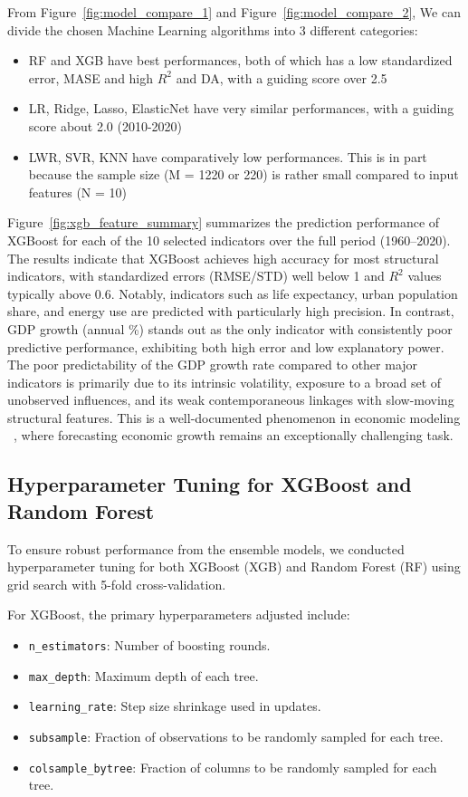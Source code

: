 \documentclass[12pt]{article}
\begin{document}
From Figure~\ref{fig:model_compare_1} and Figure~\ref{fig:model_compare_2}, We can divide the chosen Machine Learning algorithms into 3 different categories: 
\begin{itemize}
\item RF and XGB have best performances, both of which has a low standardized error, MASE and high $R^2$ and DA, with a guiding score over 2.5
\item LR, Ridge, Lasso, ElasticNet have very similar performances, with a guiding score about 2.0 (2010-2020)
\item LWR, SVR, KNN have comparatively low performances. This is in part because the sample size (M = 1220 or 220) is rather small compared to input features (N = 10)
\end{itemize}
Figure~\ref{fig:xgb_feature_summary} summarizes the prediction performance of XGBoost for each of the 10 selected indicators over the full period (1960--2020). The results indicate that XGBoost achieves high accuracy for most structural indicators, with standardized errors (RMSE/STD) well below 1 and $R^2$ values typically above 0.6. Notably, indicators such as life expectancy, urban population share, and energy use are predicted with particularly high precision. In contrast, GDP growth (annual \%) stands out as the only indicator with consistently poor predictive performance, exhibiting both high error and low explanatory power. The poor predictability of the GDP growth rate compared to other major indicators is primarily due to its intrinsic volatility, exposure to a broad set of unobserved influences, and its weak contemporaneous linkages with slow-moving structural features. This is a well-documented phenomenon in economic modeling ~\cite{Loungani2001, ClementsHendry2002}, where forecasting economic growth remains an exceptionally challenging task.


\subsection{Hyperparameter Tuning for XGBoost and Random Forest}

To ensure robust performance from the ensemble models, we conducted hyperparameter tuning for both XGBoost (XGB) and Random Forest (RF) using grid search with 5-fold cross-validation.

For XGBoost, the primary hyperparameters adjusted include:
\begin{itemize}
    \item \texttt{n\_estimators}: Number of boosting rounds.
    \item \texttt{max\_depth}: Maximum depth of each tree.
    \item \texttt{learning\_rate}: Step size shrinkage used in updates.
    \item \texttt{subsample}: Fraction of observations to be randomly sampled for each tree.
    \item \texttt{colsample\_bytree}: Fraction of columns to be randomly sampled for each tree.
\end{itemize}
\end{document}
